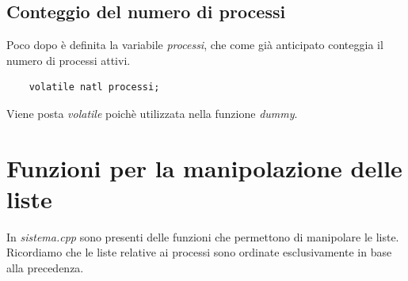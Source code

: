 \subsection{Conteggio del numero di processi}
Poco dopo è definita la variabile \emph{processi}, che come già anticipato conteggia il numero di processi attivi.
\begin{verbatim}
	volatile natl processi;
\end{verbatim}
Viene posta \emph{volatile} poichè utilizzata nella funzione \emph{dummy}.

\section{Funzioni per la manipolazione delle liste}
In \emph{sistema.cpp} sono presenti delle funzioni che permettono di manipolare le liste. Ricordiamo che le liste relative ai processi sono ordinate esclusivamente in base alla precedenza. 
